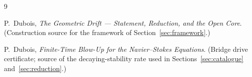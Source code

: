 \documentclass[11pt]{article}
\begin{document}
\begin{thebibliography}{9}\label{sec:bib}

P.~Dubois,
\emph{The Geometric Drift --- Statement, Reduction, and the Open Core}.
(Construction source for the framework of Section~\ref{sec:framework}.)

P.~Dubois,
\emph{Finite-Time Blow-Up for the Navier--Stokes Equations}.
(Bridge drive certificate; source of the decaying-stability rate used in
Sections~\ref{sec:catalogue} and~\ref{sec:reduction}.)

\end{thebibliography}
\end{document}
